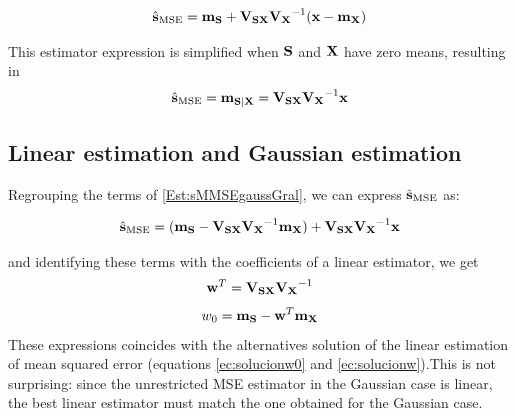 {\begin{framed}
\begin{align}
\hat{\bf s}_{\text{MSE}} = {\bf m}_{\bf S} + {\bf V}_{\bf SX}{\bf V_X}^{-1}({\bf x}-{\bf m}_{\bf X}) 
\label{Est:sMMSEgaussGral}
\end{align}
\end{framed}
This estimator expression is simplified when ${\bf S}$ and ${\bf X}$ have zero means, resulting in
\begin{align}
\hat{\bf s}_{\text{MSE}} = {\bf m}_{{\bf S}|{\bf X}} 
      = {\bf V}_{\bf SX}{\bf V_X}^{-1}{\bf x} 
      \label{Est:sMMSEgaussMN0}
\end{align}}


\subsection{Linear estimation and Gaussian estimation}

Regrouping the terms of \eqref{Est:sMMSEgaussGral}, we can express $\hat{\bf s}_{\text{MSE}}$ as:
\begin{framed}
\begin{align}
\hat{\bf s}_{\text{MSE}} = ({\bf m}_{\bf S} - {\bf V}_{\bf SX}{\bf V_X}^{-1}{\bf m}_{\bf X} )+ {\bf V}_{\bf SX}{\bf V_X}^{-1}{\bf x} 
\end{align}
\end{framed}
and identifying these terms with the coefficients of a linear estimator, we get
\begin{align} 
{\bf w}^T =  {\bf V}_{\bf SX}{\bf V_X}^{-1}
\end{align}
\begin{align} 
w_0 = {\bf m}_{\bf S} - {\bf w}^T {\bf m}_{\bf X}
\end{align}
These expressions coincides with the alternatives solution of the linear estimation of mean squared error (equations \ref{ec:solucionw0} and  \ref{ec:solucionw}).This is not surprising: since the unrestricted MSE estimator in the Gaussian case is linear, the best linear estimator must match the one obtained for the Gaussian case.


